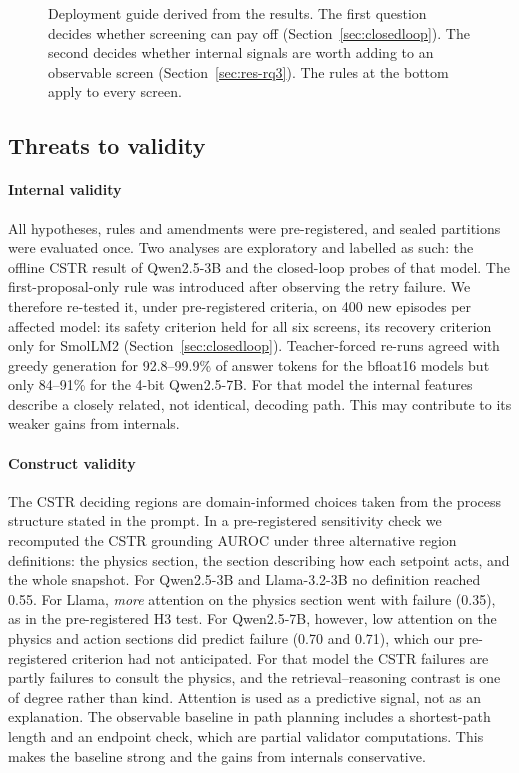 \begin{figure}[!htbp]
\centering

\caption{Deployment guide derived from the results. The first question decides whether screening can pay off
(Section~\ref{sec:closedloop}). The second decides whether internal signals are worth adding to an observable
screen (Section~\ref{sec:res-rq3}). The rules at the bottom apply to every screen.}
\label{fig:guide}
\end{figure}

\subsection{Threats to validity}
\paragraph{Internal validity} All hypotheses, rules and amendments were pre-registered, and sealed partitions
were evaluated once. Two analyses are exploratory and labelled as such: the offline CSTR result of Qwen2.5-3B
and the closed-loop probes of that model. The first-proposal-only rule was introduced after observing the retry
failure. We therefore re-tested it, under pre-registered criteria, on 400 new episodes per affected model: its
safety criterion held for all six screens, its recovery criterion only for SmolLM2
(Section~\ref{sec:closedloop}). Teacher-forced re-runs
agreed with greedy generation for 92.8--99.9\% of answer tokens for the bfloat16 models but only 84--91\% for the
4-bit Qwen2.5-7B. For that model the internal features describe a closely related, not identical, decoding path.
This may contribute to its weaker gains from internals.

\paragraph{Construct validity} The CSTR deciding regions are domain-informed choices taken from the process
structure stated in the prompt. In a pre-registered sensitivity check we recomputed the CSTR grounding AUROC under
three alternative region definitions: the physics section, the section describing how each setpoint acts, and the
whole snapshot. For Qwen2.5-3B and Llama-3.2-3B no definition reached 0.55. For Llama, \emph{more} attention on
the physics section went with failure (0.35), as in the pre-registered H3 test. For Qwen2.5-7B, however, low
attention on the physics and action sections did predict failure (0.70 and 0.71), which our pre-registered
criterion had not anticipated. For that model the CSTR failures are partly failures to consult the physics, and
the retrieval--reasoning contrast is one of degree rather than kind. Attention is used as a predictive signal, not as an explanation. The observable
baseline in path planning includes a shortest-path length and an endpoint check, which are partial validator
computations. This makes the baseline strong and the gains from internals conservative.

